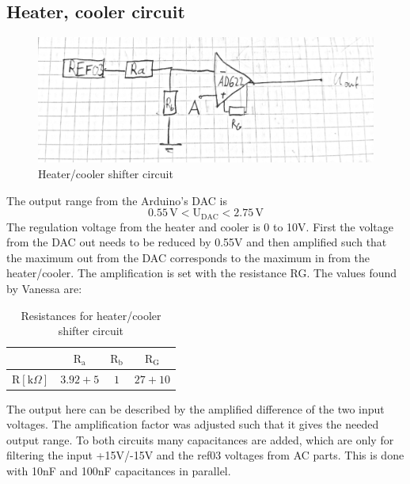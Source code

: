\documentclass[12pt]{scrartcl}
\begin{document}
    \subsection{Heater, cooler circuit}
      \begin{figure}[h]
        \includegraphics[width = \textwidth]{circ2.png}
        \caption{Heater/cooler shifter circuit}
        \label{fig3}
      \end{figure}
      The output range from the Arduino's DAC is $$0.55\, \text{V} <
      \text{U}_{\text{DAC}} < 2.75\, \text{V}$$
      The regulation voltage from the heater and cooler is 0 to 10V. First the
      voltage from the DAC out needs to be reduced by 0.55V and then amplified
      such that the maximum out from the DAC corresponds to the maximum in from
      the heater/cooler. The amplification is set with the resistance RG.
      The values found by Vanessa are: \\
      \begin{table}[H]
        \begin{tabular}{l|c c c}
          & $\text{R}_\text{a}$ & $\text{R}_\text{b}$ & $\text{R}_\text{G}$ \\
          \hline\vspace{5pt}
          $\text{R}[\text{k}\Omega]$ & $3.92 + 5$ & $1$ & $27+10$
        \end{tabular}
        \flushleft \caption{Resistances for heater/cooler shifter circuit}
      \end{table}
      \noindent The output here can be described by the amplified difference of the two
      input voltages. The amplification factor was adjusted such that it gives
      the needed output range.
      To both circuits many capacitances are added, which are only for filtering
      the input +15V/-15V and the ref03 voltages from AC parts. This is done with
      10nF and 100nF capacitances in parallel.
\end{document}
